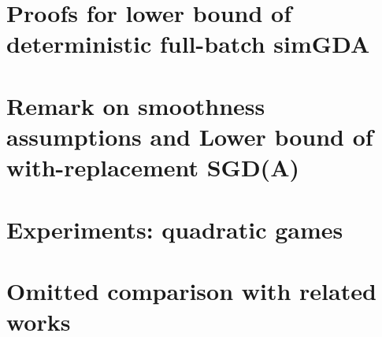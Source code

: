 \documentclass{article}
\begin{document}
\section{Proofs for lower bound of deterministic full-batch simGDA} 
\label{sec:proofs LB GDA}


\section{Remark on smoothness assumptions and Lower bound of with-replacement SGD(A)}
\label{sec:LB with-replacement}


\section{Experiments: quadratic games}
\label{sec:experimental details:quadratic}


\section{Omitted comparison with related works}
\label{sec:omitted comparison}

\end{document}
